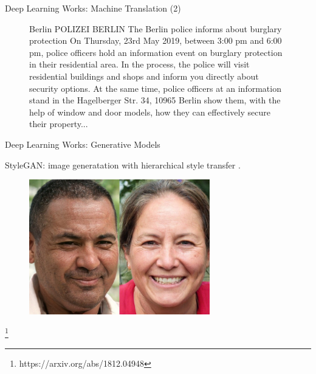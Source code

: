 \documentclass[notheorems]{beamer}
\newcommand{\source}[1]{{\let\thefootnote\relax\footnote{{\tiny #1}}}}
\begin{document}
\begin{frame}{Deep Learning Works: Machine Translation (2) }
\begin{figure}
\begin{minipage}{.42\textwidth}
                {\footnotesize Berlin POLIZEI BERLIN The Berlin police informs about burglary protection On Thursday, 23rd May 2019, between 3:00 pm and 6:00 pm, police officers hold an information event on burglary protection in their residential area. In the process, the police will visit residential buildings and shops and inform you directly about security options. At the same time, police officers at an information stand in the Hagelberger Str. 34, 10965 Berlin show them, with the help of window and door models, how they can effectively secure their property...}
            \end{minipage}
        \end{figure}
    \end{frame}

    \begin{frame}{Deep Learning Works: Generative Models}

        \begin{center}
            StyleGAN: image generatation with hierarchical style transfer \cite{karras2019style}.
        \end{center}

        \begin{figure}
            \centering
            \includegraphics[width=0.7\textwidth]{figures/style_transfer}
        \end{figure}

        \source{https://arxiv.org/abs/1812.04948}
    \end{frame}
\end{document}
